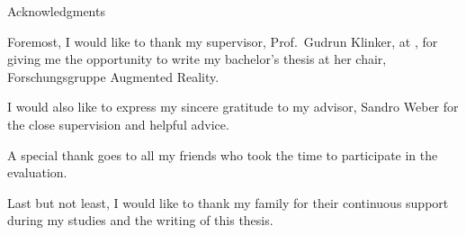 \clearpage
{}
\thispagestyle{empty}

\vspace*{20mm}

\begin{center}
	{ Acknowledgments}
\end{center}

\vspace{10mm}

Foremost, I would like to thank my supervisor, Prof.\ Gudrun Klinker, at \getUniversity{}, for giving me the opportunity to write my bachelor's thesis at her chair, Forschungsgruppe Augmented Reality.

I would also like to express my sincere gratitude to my advisor, Sandro Weber for the close supervision and helpful advice.

A special thank goes to all my friends who took the time to participate in the evaluation.

Last but not least, I would like to thank my family for their continuous support during my studies and the writing of this thesis.

\cleardoublepage{}
